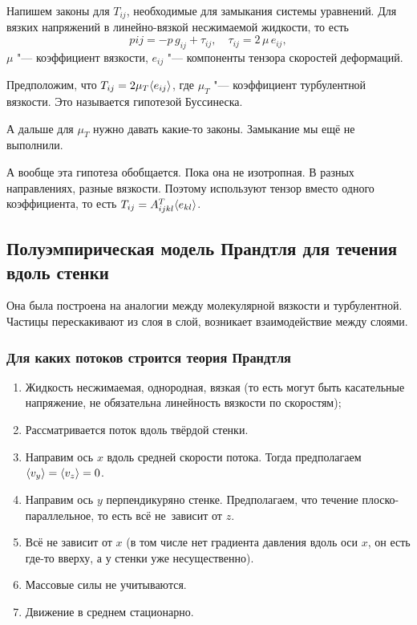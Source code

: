 Напишем законы для $T_{ij}$, необходимые для замыкания системы уравнений. Для вязких напряжений в линейно-вязкой несжимаемой жидкости, то есть
\[
  p{ij} = -p\,g_{ij} + \tau_{ij},\quad \tau_{ij} = 2\,\mu\,e_{ij},
\]
$\mu$ "--- коэффициент вязкости, $e_{ij}$ "--- компоненты тензора скоростей деформаций.

Предположим, что $T_{ij} = 2\mu_T\langle e_{ij} \rangle$, где $\mu_T$ "--- коэффициент турбулентной вязкости. Это называется гипотезой Буссинеска.

А дальше для $\mu_T$ нужно давать какие-то законы. Замыкание мы ещё не выполнили.

А вообще эта гипотеза обобщается. Пока она не изотропная. В разных направлениях, разные вязкости. Поэтому используют тензор вместо одного коэффициента, то есть $T_{ij} = A^T_{ijkl}\langle e_{kl} \rangle$.

\subsection{Полуэмпирическая модель Прандтля для течения вдоль стенки}
Она была построена на аналогии между молекулярной вязкости и турбулентной. Частицы перескакивают из слоя в слой, возникает взаимодействие между слоями.

\subsubsection{Для каких потоков строится теория Прандтля}
\begin{enumerate}
\item \label{Pra1} Жидкость несжимаемая, однородная, вязкая (то есть могут быть касательные напряжение, не обязательна линейность вязкости по скоростям);
\item Рассматривается поток вдоль твёрдой стенки.
\item Направим ось $x$ вдоль средней скорости потока. Тогда предполагаем $\langle v_y \rangle=\langle v_z \rangle=0$.
\item Направим ось $y$ перпендикуряно стенке. Предполагаем, что течение плоско-параллельное, то есть всё не~зависит от $z$.
\item \label{Pra5} Всё не зависит от $x$ (в том числе нет градиента давления вдоль оси $x$, он есть где-то вверху, а у стенки уже несущественно).
\item Массовые силы не учитываются.
\item \label{Pra7} Движение в среднем стационарно.
\end{enumerate}

